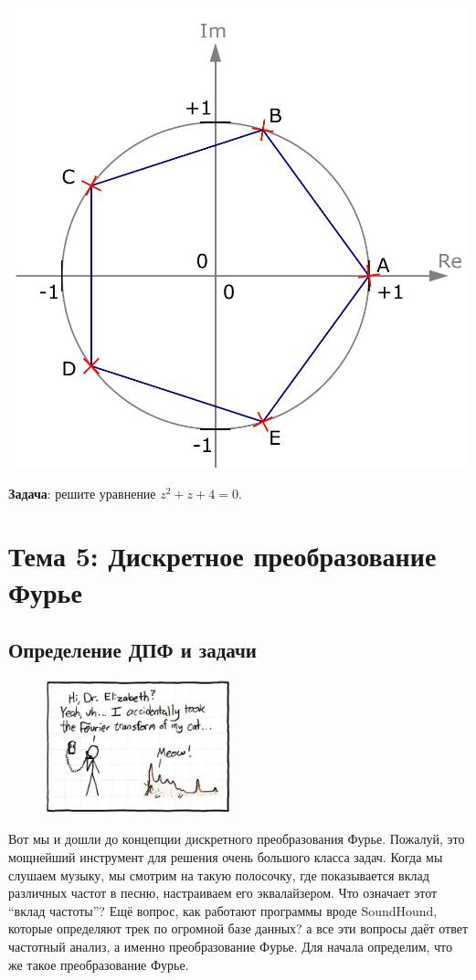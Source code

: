 \documentclass[12pt]{article}
\begin{document}
\begin{center}
\includegraphics[scale=0.7]{roots.pdf}
\end{center}

{\bf Задача}: решите уравнение $z^2 + z + 4 = 0$.

\section*{Тема 5: Дискретное преобразование Фурье}
\subsection*{Определение ДПФ и задачи}
\begin{figure}
  \begin{center}
    \includegraphics[width=0.48\textwidth]{fourierjoke.jpg}
  \end{center}
\end{figure}
Вот мы и дошли до концепции дискретного преобразования Фурье. Пожалуй, это мощнейший инструмент для решения очень большого класса задач. Когда мы слушаем музыку, мы смотрим на такую полосочку, где показывается вклад различных частот в песню, настраиваем его эквалайзером. Что означает этот ``вклад частоты''? Ещё вопрос, как работают программы вроде SoundHound, которые определяют трек по огромной базе данных? а все эти вопросы даёт ответ частотный анализ, а именно преобразование Фурье. Для начала определим, что же такое преобразование Фурье.
\end{document}
